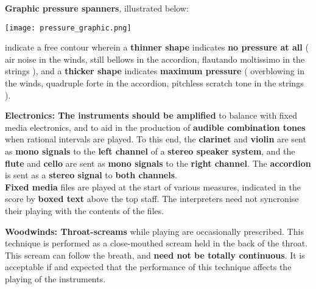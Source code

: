 \documentclass[12pt]{article}
\newcommand*\circled[1]{\tikz[baseline=(char.base)]{
            \node[shape=circle,draw,inner sep=1pt] (char) {#1};}}
\begin{document}
\textbf{\circled{7} Graphic pressure spanners}, illustrated below:  
\begin{center}
\texttt{[image: pressure\_graphic.png]} \\
\end{center}
indicate a free contour wherein a \textbf{thinner shape} indicates \textbf{no pressure at all} ( air noise in the winds, still bellows in the accordion, flautando moltissimo in the strings ), and a \textbf{thicker shape} indicates \textbf{maximum pressure} ( overblowing in the winds, quadruple forte in the accordion, pitchless scratch tone in the strings ).
\endgroup 


\begingroup
\textbf{Electronics: \circled{1} The instruments should be amplified} to balance with fixed media electronics, and to aid in the production of \textbf{audible combination tones} when rational intervals are played. To this end, the \textbf{clarinet} and \textbf{violin} are sent as \textbf{mono signals} to the \textbf{left channel} of a \textbf{stereo speaker system}, and the \textbf{flute} and \textbf{cello} are sent as \textbf{mono signals} to the \textbf{right channel}. The \textbf{accordion} is sent as a \textbf{stereo signal} to \textbf{both channels}. \\
\textbf{\circled{2} Fixed media} files are played at the start of various measures, indicated in the score by \textbf{boxed text} above the top staff. The interpreters need not syncronise their playing with the contents of the files. \\
\endgroup 

\begingroup
\textbf{Woodwinds: \circled{1} Throat-screams} while playing are occasionally prescribed. This technique is performed as a close-mouthed scream held in the back of the throat. This scream can follow the breath, and \textbf{need not be totally continuous}. It is acceptable if and expected that the performance of this technique affects the playing of the instruments. 
\endgroup 
\end{document}
